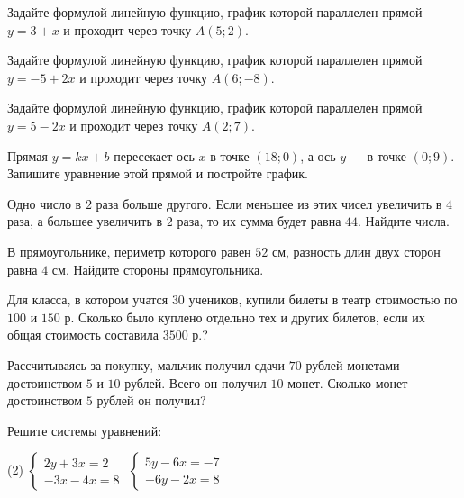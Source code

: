 \begin{class}[number=9]
	\begin{listofex}
		\item Задайте формулой линейную функцию, график которой параллелен прямой \(y=3+x\) и проходит через точку \(A(5; 2)\).
		\item Задайте формулой линейную функцию, график которой параллелен прямой \(y=-5+2x\) и проходит через точку \(A(6; -8)\).
		\item Задайте формулой линейную функцию, график которой параллелен прямой \(y=5-2x\) и проходит через точку \(A(2; 7)\).
		\item Прямая \(y=kx+b\) пересекает ось \(x\) в точке \((18; 0)\), а ось \(y\) --- в точке \((0; 9)\). Запишите уравнение этой прямой и постройте график.
		
		
		\item Одно число в \(2\) раза больше другого. Если меньшее из этих чисел увеличить в \(4\) раза, а большее увеличить в \(2\) раза, то их сумма будет равна \(44\). Найдите числа.
		\item В прямоугольнике, периметр которого равен \(52\) см, разность длин двух сторон равна \(4\) см. Найдите стороны прямоугольника.
		\item Для класса, в котором учатся \(30\) учеников, купили билеты в театр стоимостью по \(100\) и \(150\) р. Сколько было куплено отдельно тех и других билетов, если их общая стоимость составила \(3500\) р.?
		\item Рассчитываясь за покупку, мальчик получил сдачи \(70\) рублей монетами достоинством \(5\) и \(10\) рублей. Всего он получил \(10\) монет. Сколько монет достоинством \(5\) рублей он получил?
		\item Решите системы уравнений:
		\begin{tasks}(2)
			\task \( \begin{cases} 2y+3x=2\\-3x-4x=8 \end{cases} \)
			\task \( \begin{cases} 5y-6x=-7 \\ -6y-2x=8 \end{cases} \)
		\end{tasks}
	\end{listofex}
\end{class}
